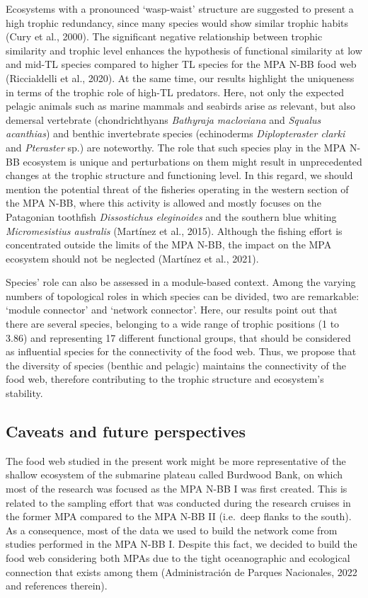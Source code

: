 \documentclass[preprint, 3p,
authoryear]{elsarticle} %
\begin{document}
Ecosystems with a pronounced `wasp-waist' structure are suggested to
present a high trophic redundancy, since many species would show similar
trophic habits (Cury et al., 2000). The significant negative
relationship between trophic similarity and trophic level enhances the
hypothesis of functional similarity at low and mid-TL species compared
to higher TL species for the MPA N-BB food web (Riccialdelli et al.,
2020). At the same time, our results highlight the uniqueness in terms
of the trophic role of high-TL predators. Here, not only the expected
pelagic animals such as marine mammals and seabirds arise as relevant,
but also demersal vertebrate (chondrichthyans \emph{Bathyraja
macloviana} and \emph{Squalus acanthias}) and benthic invertebrate
species (echinoderms \emph{Diplopteraster clarki} and \emph{Pteraster}
sp.) are noteworthy. The role that such species play in the MPA N-BB
ecosystem is unique and perturbations on them might result in
unprecedented changes at the trophic structure and functioning level. In
this regard, we should mention the potential threat of the fisheries
operating in the western section of the MPA N-BB, where this activity is
allowed and mostly focuses on the Patagonian toothfish
\emph{Dissostichus eleginoides} and the southern blue whiting
\emph{Micromesistius australis} (Martínez et al., 2015). Although the
fishing effort is concentrated outside the limits of the MPA N-BB, the
impact on the MPA ecosystem should not be neglected (Martínez et al.,
2021).

Species' role can also be assessed in a module-based context. Among the
varying numbers of topological roles in which species can be divided,
two are remarkable: `module connector' and `network connector'. Here,
our results point out that there are several species, belonging to a
wide range of trophic positions (1 to 3.86) and representing 17
different functional groups, that should be considered as influential
species for the connectivity of the food web. Thus, we propose that the
diversity of species (benthic and pelagic) maintains the connectivity of
the food web, therefore contributing to the trophic structure and
ecosystem's stability.

\hypertarget{caveats-and-future-perspectives}{%
\subsection{Caveats and future
perspectives}\label{caveats-and-future-perspectives}}

The food web studied in the present work might be more representative of
the shallow ecosystem of the submarine plateau called Burdwood Bank, on
which most of the research was focused as the MPA N-BB I was first
created. This is related to the sampling effort that was conducted
during the research cruises in the former MPA compared to the MPA N-BB
II (i.e.~deep flanks to the south). As a consequence, most of the data
we used to build the network come from studies performed in the MPA N-BB
I. Despite this fact, we decided to build the food web considering both
MPAs due to the tight oceanographic and ecological connection that
exists among them (Administración de Parques Nacionales, 2022 and
references therein).
\end{document}
